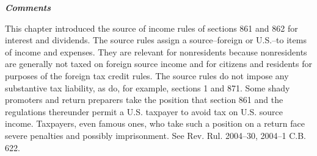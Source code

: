 	\begin{center}
		\textbf{\emph{Comments}}
			\end{center}



This chapter introduced the source of income rules of sections 861 and 862 for interest and dividends.  The source rules assign a source--foreign or U.S.--to items of income and expenses.  They are relevant for nonresidents because nonresidents are generally not taxed on foreign source income and for citizens and residents for purposes of the foreign tax credit rules.  The source rules do not impose any substantive tax liability, as do, for example, sections 1 and 871.  Some shady promoters and return preparers take the position that section 861 and the regulations thereunder permit a U.S. taxpayer to avoid tax on U.S. source income.  Taxpayers, even famous ones, who take such a position on a return face severe penalties and possibly imprisonment.  See Rev. Rul.  2004--30, 2004--1 C.B. 622.    
